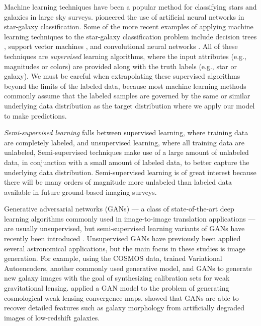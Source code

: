 \documentclass[fleqn,usenatbib]{mnras}
\newcommand{\eg}{{e.g., }}
\begin{document}
Machine learning techniques have been a popular method for classifying stars and galaxies in large sky surveys.
\citet{odewahn1992automated} pioneered the use of artificial neural networks in star-galaxy classification.
Some of the more recent examples of applying machine learning techniques to the star-galaxy classification problem include
decision trees \citep[\eg][]{ball2006robust},
support vector machines \citep[\eg][]{fadely2012},
and convolutional neural networks \citep{kim2017star}.
All of these techniques are \emph{supervised} learning algorithms,
where the input attributes (\eg magnitudes or colors) are provided along with the truth labels (\eg star or galaxy).
We must be careful when extrapolating these supervised algorithms beyond the limits of the labeled data,
because most machine learning methods commonly assume that the labeled samples are governed by
the same or similar underlying data distribution as the target distribution where we apply our model to make predictions.

\emph{Semi-supervised learning} falls between supervised learning, where training data are completely labeled,
and unsupervised learning, where all training data are unlabeled,
Semi-supervised techniques make use of a large amount of unlabeled data, in conjunction with a small amount of labeled data,
to better capture the underlying data distribution.
Semi-supervised learning is of great interest because there will be many orders of magnitude
more unlabeled than labeled data available in future ground-based imaging surveys.

Generative adversarial networks (GANs) --- a class of state-of-the-art deep learning algorithms commonly used in
image-to-image translation applications --- are usually unsupervised,
but semi-supervised learning variants of GANs have recently been introduced
\citep{springenberg2016unsupervised,salimans2016improved,odena2016semi}.
Unsupervised GANs have previously been applied several astronomical applications,
but the main focus in these studies is image generation.
For example, using the COSMOS data, \citet{ravanbakhsh2017enabling} trained Variational Autoencoders,
another commonly used generative model, and GANs to generate new galaxy images
with the goal of synthesizing calibration sets for weak gravitational lensing.
\citet{mustafa2017creating} applied a GAN model to the problem of generating cosmological weak lensing convergence maps.
\citet{schawinski2017generative} showed that GANs are able to recover detailed features such as galaxy morphology
from artificially degraded images of low-redshift galaxies.
\end{document}

